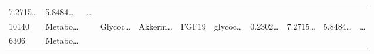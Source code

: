 \documentclass[
]{article}
\begin{document}
\begin{longtable}[]{@{}lllllllllll@{}}
\begin{minipage}[t]{0.07\columnwidth}
7.2715\ldots{}\strut
\end{minipage} & \begin{minipage}[t]{0.07\columnwidth}\raggedright
5.8484\ldots{}\strut
\end{minipage} & \begin{minipage}[t]{0.03\columnwidth}\raggedright
\ldots{}\strut
\end{minipage}\tabularnewline
\begin{minipage}[t]{0.05\columnwidth}\raggedright
10140\strut
\end{minipage} & \begin{minipage}[t]{0.07\columnwidth}\raggedright
Metabo\ldots{}\strut
\end{minipage} & \begin{minipage}[t]{0.07\columnwidth}\raggedright
\strut
\end{minipage} & \begin{minipage}[t]{0.09\columnwidth}\raggedright
Glycoc\ldots{}\strut
\end{minipage} & \begin{minipage}[t]{0.07\columnwidth}\raggedright
Akkerm\ldots{}\strut
\end{minipage} & \begin{minipage}[t]{0.07\columnwidth}\raggedright
FGF19\strut
\end{minipage} & \begin{minipage}[t]{0.09\columnwidth}\raggedright
glycoc\ldots{}\strut
\end{minipage} & \begin{minipage}[t]{0.07\columnwidth}\raggedright
0.2302\ldots{}\strut
\end{minipage} & \begin{minipage}[t]{0.07\columnwidth}\raggedright
7.2715\ldots{}\strut
\end{minipage} & \begin{minipage}[t]{0.07\columnwidth}\raggedright
5.8484\ldots{}\strut
\end{minipage} & \begin{minipage}[t]{0.03\columnwidth}\raggedright
\ldots{}\strut
\end{minipage}\tabularnewline
\begin{minipage}[t]{0.05\columnwidth}\raggedright
6306\strut
\end{minipage} & \begin{minipage}[t]{0.07\columnwidth}\raggedright
Metabo\ldots{}\strut
\end{minipage} & \begin{minipage}[t]{0.07\columnwidth}\raggedright

\end{minipage}
\end{longtable}
\end{document}
